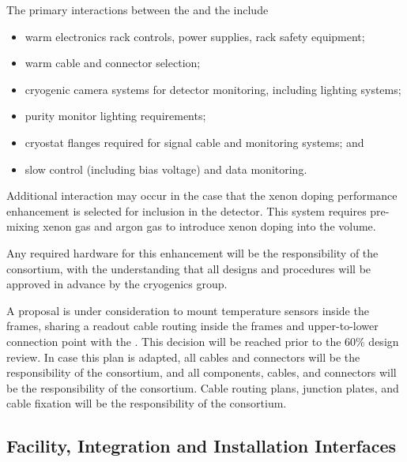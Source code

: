 The primary interactions between the  and the  include

\begin{itemize}
    \item warm electronics rack controls, power supplies, rack safety equipment;
    \item warm cable and connector selection;
    \item cryogenic camera systems for detector monitoring, including lighting systems;
    \item purity monitor lighting requirements;
    \item cryostat flanges required for  signal cable and monitoring systems; and
    \item {} slow control (including bias voltage) and data monitoring.
\end{itemize}

Additional interaction may occur in the case that the xenon doping performance enhancement is selected for inclusion in the detector.  This system requires pre-mixing xenon gas and argon gas to introduce xenon doping into the \lar volume. 


Any required hardware for this enhancement will be the responsibility of the  consortium, with the understanding that all designs and procedures will be approved in advance by the cryogenics group. 


A proposal is under consideration to mount  temperature sensors inside the  frames, sharing a readout cable routing inside the  frames and upper-to-lower  connection point with the .  This decision will be reached prior to the 60\% design review.  In case this plan is adapted, all  cables and connectors will be the responsibility of the  consortium, and all  components, cables, and connectors will be the responsibility of the  consortium.  Cable routing plans, junction plates, and cable fixation will be the responsibility of the  consortium.

\subsection{Facility, Integration and Installation Interfaces}

